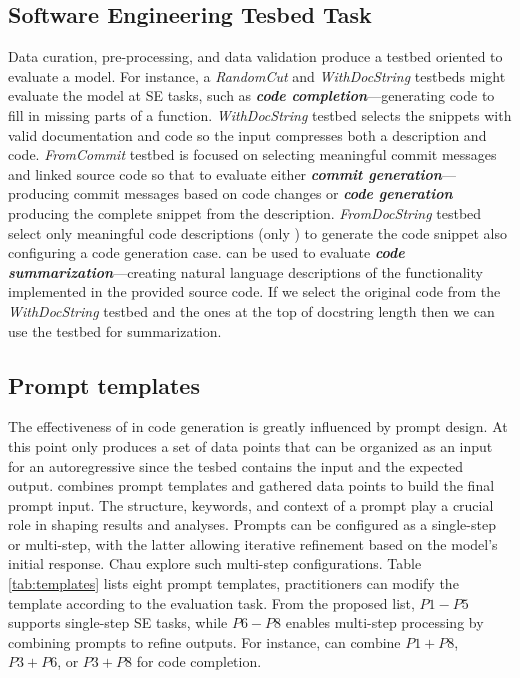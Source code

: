 \subsection{Software Engineering Tesbed Task}
\label{sec:se_tasks}

Data curation, pre-processing, and data validation produce a testbed oriented to evaluate a model. For instance, a \textit{RandomCut} and \textit{WithDocString} testbeds might evaluate the model at SE tasks, such as \textit{\textbf{code completion}}—generating code to fill in missing parts of a function. \textit{WithDocString} testbed selects the snippets with valid documentation and code so the \llm input compresses both a description and code.
\textit{FromCommit} testbed is focused on selecting meaningful commit messages and linked source code so that to evaluate either \textit{\textbf{commit generation}}—producing commit messages based on code changes or \textit{\textbf{code generation}} producing the complete snippet from the description.  \textit{FromDocString} testbed select only meaningful code descriptions (\ie only \docstring) to generate the code snippet also configuring a code generation case.
\snipgen can be used to evaluate \textit{\textbf{code summarization}}—creating natural language descriptions of the functionality implemented in the provided source code. If we select the original code from the \textit{WithDocString} testbed and the ones at the top of docstring length then we can use the testbed for summarization.



\subsection{Prompt templates}
\label{sec:prompt_templates}




The effectiveness of \llms in code generation is greatly influenced by prompt design. At this point \snipgen only produces a set of data points that can be organized as an input for an autoregressive \llm since the tesbed contains the input and the expected output. \snipgen combines prompt templates and gathered data points to build the final prompt input. The structure, keywords, and context of a prompt play a crucial role in shaping results and analyses. Prompts can be configured as a single-step or multi-step, with the latter allowing iterative refinement based on the model's initial response. Chau \etal \cite{liu_improving_2023} explore such multi-step configurations. Table \ref{tab:templates} lists eight prompt templates, practitioners can modify the template according to the evaluation task. From the proposed list, $P1-P5$ supports single-step SE tasks, while $P6-P8$ enables multi-step processing by combining prompts to refine outputs. For instance, \snipgen can combine $P1+P8$, $P3+P6$, or $P3+P8$ for code completion.


